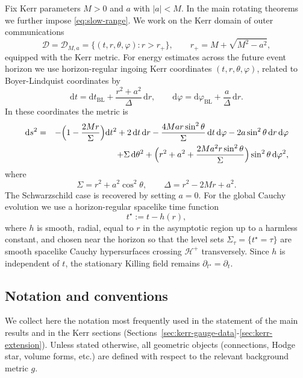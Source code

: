 \documentclass[11pt]{article}
\numberwithin{equation}{section}
\theoremstyle{plain}
\theoremstyle{definition}
\theoremstyle{remark}
\newcommand{\D}{\mathcal{D}}
\newcommand{\dd}{\mathrm{d}}
\begin{document}
Fix Kerr parameters \(M>0\) and \(a\) with \(|a|<M\).  In the main rotating theorems we further impose \eqref{eq:slow-range}.  We work on the Kerr domain of outer communications
\begin{equation}
 \D=\D_{M,a}=\{(t,r,\theta,\varphi): r>r_{+}\},
 \qquad
 r_{+}=M+\sqrt{M^{2}-a^{2}},
\end{equation}
equipped with the Kerr metric.  For energy estimates across the future event horizon we use horizon-regular ingoing Kerr coordinates \((t,r,\theta,\varphi)\), related to Boyer-Lindquist coordinates by
\begin{equation}
 \dd t = \dd t_{\mathrm{BL}} + \frac{r^{2}+a^{2}}{\Delta}\,\dd r,
 \qquad
 \dd\varphi = \dd\varphi_{\mathrm{BL}} + \frac{a}{\Delta}\,\dd r.
\end{equation}
In these coordinates the metric is
\begin{eqnarray}\label{metric}
\dd s^{2}
&=&
-\Bigl(1-\frac{2Mr}{\Sigma}\Bigr)\dd t^{2}
+2\,\dd t\,\dd r
-\frac{4Mar\sin^{2}\theta}{\Sigma}\,\dd t\,\dd\varphi
-2a\sin^{2}\theta\,\dd r\,\dd\varphi
\nonumber\\
&&
+\Sigma\,\dd\theta^{2}
+\Bigl(r^{2}+a^{2}+\frac{2Ma^{2}r\sin^{2}\theta}{\Sigma}\Bigr)
\sin^{2}\theta\,\dd\varphi^{2},
\end{eqnarray}
where
\begin{equation}
 \Sigma=r^{2}+a^{2}\cos^{2}\theta,
 \qquad
 \Delta=r^{2}-2Mr+a^{2}.
\end{equation}
The Schwarzschild case is recovered by setting \(a=0\).  For the global Cauchy evolution we use a horizon-regular spacelike time function
\begin{equation}\label{eq:kerr-tstar}
 t^{\star}:=t-h(r),
\end{equation}
where \(h\) is smooth, radial, equal to \(r\) in the asymptotic region up to a harmless constant, and chosen near the horizon so that the level sets \(\Sigma_{\tau}=\{t^{\star}=\tau\}\) are smooth spacelike Cauchy hypersurfaces crossing \(\mathcal H^{+}\) transversely.  Since \(h\) is independent of \(t\), the stationary Killing field remains \(\partial_{t^{\star}}=\partial_t\).

\subsection{Notation and conventions}\label{subsec:notation-global}

We collect here the notation most frequently used in the statement of the main results and in the Kerr sections (Sections~\ref{sec:kerr-gauge-data}-\ref{sec:kerr-extension}).
Unless stated otherwise, all geometric objects (connections, Hodge star, volume forms, etc.) are defined with respect to the relevant background metric $g$.
\end{document}
